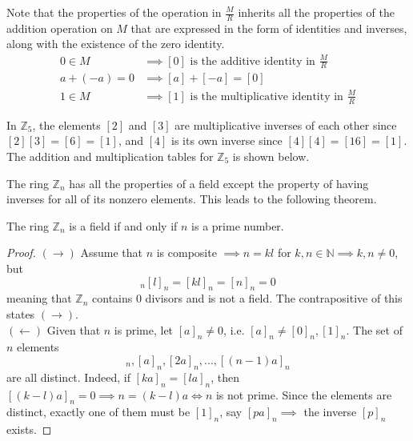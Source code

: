 \documentclass{article}
\begin{document}
    Note that the properties of the operation in $\frac{M}{R}$ inherits all the properties of the addition operation on $M$ that are expressed in the form of identities and inverses, along with the existence of the zero identity. 
    \begin{align*}
      0 \in M & \implies [0] \text{ is the additive identity in } \frac{M}{R} \\
      a + (-a) = 0 & \implies [a] + [-a] = [0] \\
      1 \in M & \implies [1] \text{ is the multiplicative identity in } \frac{M}{R}
    \end{align*}

    \begin{example}
      In $\mathbb{Z}_{5}$, the elements $[2]$ and $[3]$ are multiplicative inverses of each other since $[2] [3] = [6] = [1]$, and $[4]$ is its own inverse since $[4] [4] = [16] = [1]$. The addition and multiplication tables for $\mathbb{Z}_5$ is shown below. 
    \end{example}

    The ring $\mathbb{Z}_n$ has all the properties of a field except the property of having inverses for all of its nonzero elements. This leads to the following theorem. 

    \begin{theorem}
      The ring $\mathbb{Z}_{n}$ is a field if and only if $n$ is a prime number. 
    \end{theorem}
    \begin{proof}
      $(\rightarrow)$ Assume that $n$ is composite $\implies n = k l$ for $k, n \in \mathbb{N} \implies k, n \neq 0$, but 
      \begin{equation}
        [k]_n [l]_n = [k l]_n = [n]_n = 0
      \end{equation}
      meaning that $\mathbb{Z}_n$ contains $0$ divisors and is not a field. The contrapositive of this states $(\rightarrow)$. \\
      $(\leftarrow)$ Given that $n$ is prime, let $[a]_n \neq 0$, i.e. $[a]_n \neq [0]_n, [1]_n$. The set of $n$ elements 
      \begin{equation}
        [0]_n, [a]_n, [2a]_n, ..., [(n-1)a]_n
      \end{equation}
      are all distinct. Indeed, if $[k a]_n = [l a]_n$, then $[(k-l) a]_n = 0 \implies n = (k-l) a \iff n$ is not prime. Since the elements are distinct, exactly one of them must be $[1]_n$, say $[p a]_n \implies$ the inverse $[p]_n$ exists. 
    \end{proof}
\end{document}
